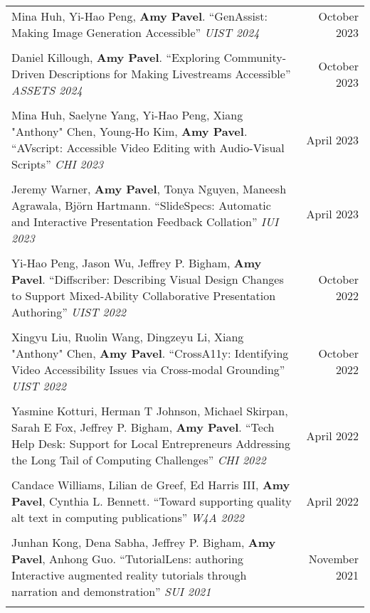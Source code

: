 \begin{longtable}{Xr}
	Mina Huh, Yi-Hao Peng, \textbf{Amy Pavel}. ``GenAssist: Making Image Generation Accessible'' \textit{UIST 2024} & October 2023 \\
	\\

	Daniel Killough, \textbf{Amy Pavel}. ``Exploring Community-Driven Descriptions for Making Livestreams Accessible'' \textit{ASSETS 2024} & October 2023 \\
	\\

	Mina Huh, Saelyne Yang, Yi-Hao Peng, Xiang "Anthony" Chen, Young-Ho Kim, \textbf{Amy Pavel}. ``AVscript: Accessible Video Editing with Audio-Visual Scripts'' \textit{CHI 2023} & April 2023 \\
	\\

	Jeremy Warner, \textbf{Amy Pavel}, Tonya Nguyen, Maneesh Agrawala, Björn Hartmann. ``SlideSpecs: Automatic and Interactive Presentation Feedback Collation'' \textit{IUI 2023} & April 2023 \\
	\\

	Yi-Hao Peng, Jason Wu, Jeffrey P. Bigham, \textbf{Amy Pavel}. ``Diffscriber: Describing Visual Design Changes to Support Mixed-Ability Collaborative Presentation Authoring'' \textit{UIST 2022} & October 2022 \\
	\\

	Xingyu Liu, Ruolin Wang, Dingzeyu Li, Xiang "Anthony" Chen, \textbf{Amy Pavel}. ``CrossA11y: Identifying Video Accessibility Issues via Cross-modal Grounding'' \textit{UIST 2022} & October 2022 \\
	\\

	Yasmine Kotturi, Herman T Johnson, Michael Skirpan, Sarah E Fox, Jeffrey P. Bigham, \textbf{Amy Pavel}. ``Tech Help Desk: Support for Local Entrepreneurs Addressing the Long Tail of Computing Challenges'' \textit{CHI 2022} & April 2022 \\
	\\

	Candace Williams, Lilian de Greef, Ed Harris III, \textbf{Amy Pavel}, Cynthia L. Bennett. ``Toward supporting quality alt text in computing publications'' \textit{W4A 2022} & April 2022 \\
	\\

	Junhan Kong, Dena Sabha, Jeffrey P. Bigham, \textbf{Amy Pavel}, Anhong Guo. ``TutorialLens: authoring Interactive augmented reality tutorials through narration and demonstration'' \textit{SUI 2021} & November 2021 \\
	\\


\end{longtable}
